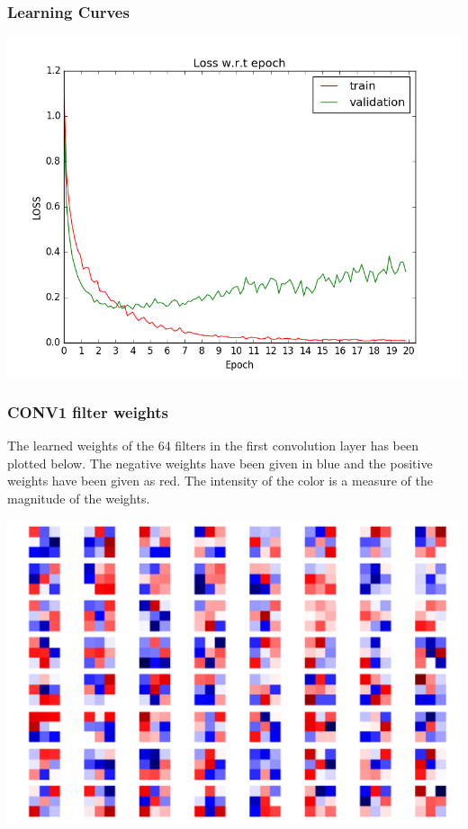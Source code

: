 \documentclass[12pt]{report}
\begin{document}
\subsubsection{Learning Curves}
\begin{center}
\includegraphics[scale=0.6]{loss.png}
\end{center}
\subsubsection{CONV1 filter weights}
The learned weights of the 64 filters in the first convolution layer has been plotted below. The negative weights have been given in blue and the positive weights have been given as red. The intensity of the color is a measure of the magnitude of the weights.
\begin{center}
\includegraphics[scale=0.6]{filter.png}
\end{center}
\end{document}
